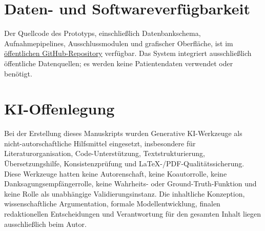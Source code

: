 \documentclass[12pt,a4paper]{article}
\begin{document}
\section*{Daten- und Softwareverfügbarkeit}

Der Quellcode des Prototyps, einschließlich Datenbankschema, Aufnahmepipelines, Ausschlussmodulen und grafischer Oberfläche, ist im \href{https://github.com/um-bruch/system-medicine}{öffentlichen GitHub-Repository} verfügbar. Das System integriert ausschließlich öffentliche Datenquellen; es werden keine Patientendaten verwendet oder benötigt.

\section*{KI-Offenlegung}

Bei der Erstellung dieses Manuskripts wurden Generative KI-Werkzeuge
als nicht-autorschaftliche Hilfsmittel
eingesetzt, insbesondere für Literaturorganisation, Code-Unterstützung,
Textstrukturierung, Übersetzungshilfe, Konsistenzprüfung und
LaTeX-/PDF-Qualitätssicherung. Diese Werkzeuge hatten keine Autorenschaft,
keine Koautorrolle, keine Danksagungsempfängerrolle, keine Wahrheits- oder
Ground-Truth-Funktion und keine Rolle als unabhängige Validierungsinstanz.
Die inhaltliche Konzeption, wissenschaftliche Argumentation, formale
Modellentwicklung, finalen redaktionellen Entscheidungen und Verantwortung
für den gesamten Inhalt liegen ausschließlich beim Autor.



\end{document}
